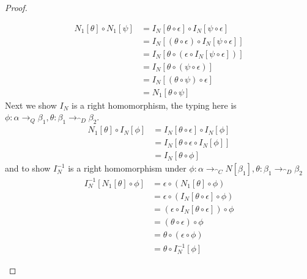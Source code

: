 \documentclass{article}
\begin{document}
\begin{proof}
\begin{enumerate}
\begin{align*}
      N_1[\theta] \circ N_1[\psi]
      &= I_N[\theta \circ \epsilon] \circ I_N[\psi \circ \epsilon]\\
      &= I_N[(\theta \circ \epsilon) \circ I_N[\psi \circ \epsilon]]\tag{left homomorphism}\\
      &= I_N[\theta \circ (\epsilon \circ I_N[\psi \circ \epsilon])]\\
      &= I_N[\theta \circ (\psi \circ \epsilon)] \tag{$\beta$}\\
      &= I_N[(\theta \circ \psi) \circ \epsilon]\\
      &= N_1[\theta \circ \psi]
    \end{align*}
    Next we show $I_N$ is a right homomorphism, the typing here is
    $\phi : \alpha \to_{Q} \beta_1, \theta : \beta_1 \to_{\cat D}
    \beta_2$.
    \begin{align*}
      N_1[\theta] \circ I_N[\phi] &= I_N[\theta \circ \epsilon] \circ I_N[\phi]\\
      &= I_N[\theta \circ \epsilon \circ I_N[\phi]]\tag{left homomorphism}\\
      &= I_N[\theta \circ \phi] \tag{$\beta$}
    \end{align*}
    and to show $I_N^{-1}$ is a right homomorphism under $\phi : \alpha \to_{\cat C}N[\beta_1], \theta : \beta_1 \to_{\cat D} \beta_2$
    \begin{align*}
      I_N^{-1}[N_1[\theta] \circ \phi] &= \epsilon \circ (N_1[\theta] \circ \phi) \tag{def}\\
      &= \epsilon \circ (I_N[\theta \circ \epsilon] \circ \phi)\tag{def}\\
      &= (\epsilon \circ I_N[\theta \circ \epsilon]) \circ \phi\tag{assoc}\\
      &= (\theta \circ \epsilon) \circ \phi\tag{$\beta$}\\
      &= \theta \circ (\epsilon \circ \phi)\tag{assoc}\\
      &= \theta \circ I_N^{-1}[\phi] \tag{def}
    \end{align*}
  \end{enumerate}


\end{proof}
\end{document}
